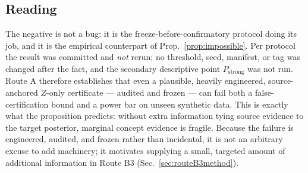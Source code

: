 \subsection{Reading}
The negative is not a bug: it is the freeze-before-confirmatory protocol doing its job, and it is the
empirical counterpart of Prop.~\ref{prop:impossible}. Per protocol the result was committed and \emph{not}
rerun; no threshold, seed, manifest, or tag was changed after the fact, and the secondary descriptive point
$P_{\text{strong}}$ was not run. Route A therefore establishes that even a plausible, heavily engineered,
source-anchored $Z$-only certificate --- audited and frozen --- can fail both a false-certification bound and a
power bar on unseen synthetic data. This is exactly what the proposition predicts: without extra information tying source
evidence to the target posterior, marginal concept evidence is fragile. Because the failure is engineered,
audited, and frozen rather than incidental, it is not an arbitrary excuse to add machinery; it motivates
supplying a small, targeted amount of additional information in Route B3 (Sec.~\ref{sec:routeB3method}).
